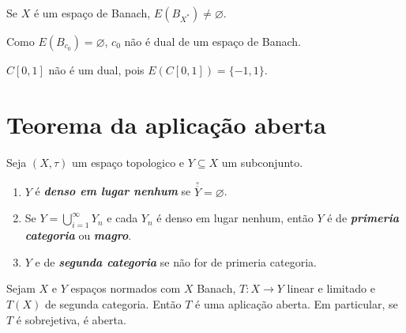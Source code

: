 \documentclass[portuguese]{article}
\theoremstyle{definition}
\begin{document}
	\begin{coro}
		Se $X$ é um espaço de Banach, $E(B_{X^*})\neq\varnothing$.
	\end{coro}
	\begin{coro}
		Como $E(B_{c_0})=\varnothing$, $c_0$ não é dual de um espaço de Banach.
	\end{coro}
	\begin{coro}
		$C[0,1]$ não é um dual, pois $E(C[0,1])=\{-1,1\}$.
	\end{coro}
	
	\section{Teorema da aplicação aberta}
	\begin{defn}
		Seja $(X,\tau)$ um espaço topologico e $Y\subseteq X$ um subconjunto.
		\begin{enumerate}
			\item $Y$ é \textbf{\textit{denso em lugar nenhum}} se $\overset{\circ}{\overline{Y}}=\varnothing$.
			\item Se $Y=\bigcup_{i=1}^\infty Y_n$ e cada $Y_n$ é denso em lugar nenhum, então $Y$ é de \textbf{\textit{primeria categoria}} ou \textbf{\textit{magro}}.
			\item $Y$ e de \textbf{\textit{segunda categoria}} se não for de primeria categoria.
		\end{enumerate}
	\end{defn}
	\begin{teo}
		Sejam $X$ e $Y$ espaços normados com $X$ Banach, $T:X\to Y$ linear e limitado e $T(X)$ de segunda categoria. Então $T$ é uma aplicação aberta. Em particular, se $T$ é sobrejetiva, é aberta.
	\end{teo}
\end{document}
